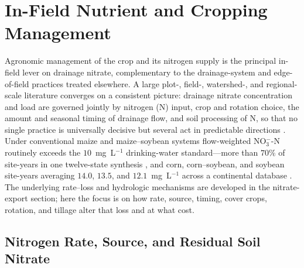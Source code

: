 \section{In-Field Nutrient and Cropping Management}

Agronomic management of the crop and its nitrogen supply is the principal
in-field lever on drainage nitrate, complementary to the drainage-system and
edge-of-field practices treated elsewhere. A large plot-, field-,
watershed-, and regional-scale literature converges on a consistent picture:
drainage nitrate concentration and load are governed jointly by nitrogen (N)
input, crop and rotation choice, the amount and seasonal timing of drainage
flow, and soil processing of N, so that no single practice is universally
decisive but several act in predictable directions
\parencite{Dinnes2002}. Under conventional maize and maize--soybean systems
flow-weighted NO$_3^-$-N routinely exceeds the $10$~mg~L$^{-1}$
drinking-water standard---more than $70\%$ of site-years in one twelve-state
synthesis \parencite{Liu2021}, and corn, corn--soybean, and soybean
site-years averaging $14.0$, $13.5$, and $12.1$~mg~L$^{-1}$ across a
continental database \parencite{Hertzberger2019}. The underlying rate--loss
and hydrologic mechanisms are developed in the nitrate-export section; here
the focus is on how rate, source, timing, cover crops, rotation, and tillage
alter that loss and at what cost.

\subsection{Nitrogen Rate, Source, and Residual Soil Nitrate}

